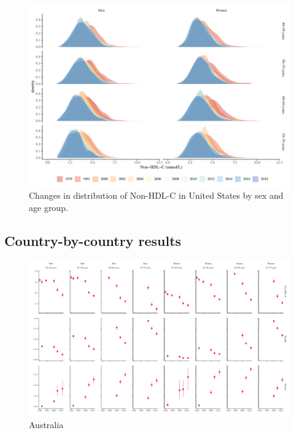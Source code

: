 \documentclass[12pt]{article}
\begin{document}
\begin{appendix}
\begin{landscape}
        \begin{figure}[H]
            \centering
            \includegraphics[width=\linewidth]{../3_figures/figS4_densities.pdf}
            \caption{Changes in distribution of Non-HDL-C in United States by sex and age group.}
            \label{fig:densities}
        \end{figure}

        \subsection{Country-by-country results}

        \begin{figure}[H]
            \centering
            \includegraphics[width=\linewidth]{../3_figures/countries/fig_australia.pdf}
            \caption{Australia}
            \label{fig:australia}
        \end{figure}
    

\end{landscape}
\end{appendix}
\end{document}
